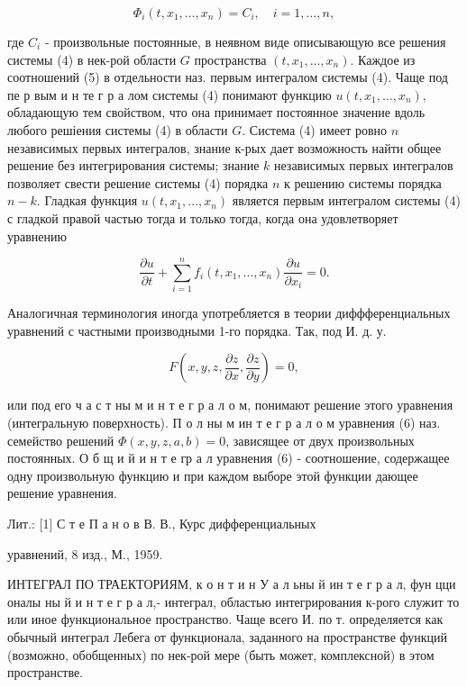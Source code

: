 \documentclass[10pt]{article}
\begin{document}
\[

\Phi_{i}\left(t, x_{1}, \ldots, x_{n}\right)=C_{i}, \quad i=1, \ldots, n,

\]



где $C_{i}$ - произвольные постоянные, в неявном виде описывающую все решения системы (4) в нек-рой области $G$ пространства $\left(t, x_{1}, \ldots, x_{n}\right)$. Каждое из соотношений (5) в отдельности наз. первым интегралом системы (4). Чаще под пе р вым и н те г р а лом системы (4) понимают функцию $u\left(t, x_{1}, \ldots, x_{n}\right)$, обладающую тем свойством, что она принимает постоянное значение вдоль любого решіения системы (4) в области $G$. Система (4) имеет ровно $n$ независимых первых интегралов, знание к-рых дает возможность найти общее решение без интегрирования системы; знание $k$ независимых первых интегралов позволяет свести решение системы (4) порядка $n$ к решению системы порядка $n-k$. Гладкая функция $u\left(t, x_{1}, \ldots, x_{n}\right)$ является первым интегралом системы (4) с гладкой правой частью тогда и только тогда, когда она удовлетворяет уравнению



\[

\frac{\partial u}{\partial t}+\sum_{i=1}^{n} f_{i}\left(t, x_{1}, \ldots, x_{n}\right) \frac{\partial u}{\partial x_{i}}=0 .

\]



Аналогичная терминология иногда употребляется в теории диффференциальных уравнений с частными производными 1-го порядка. Так, под И. д. у.



\[

F\left(x, y, z, \frac{\partial z}{\partial x}, \frac{\partial z}{\partial y}\right)=0,

\]



или под его ч а с т ны м и н т е г р а л о м, понимают решение этого уравнения (интегральную поверхность). П о л ны м ин т е г р а л о м уравнения (6) наз. семейство решений $\Phi(x, y, z, a, b)=0$, зависящее от двух произвольных постоянных. О б щ и й и н т е гр а л уравнения (6) - соотношение, содержащее одну произвольную функцию и при каждом выборе этой функции дающее решение уравнения.



Лит.: [1] С т е П а н о в В. В., Курс дифференциальных

уравнений, 8 изд., М., 1959.



ИНТЕГРАЛ ПО ТРАЕКТОРИЯМ, к о н т и н У а л ьны й ин т е г р а л, фун цци оналы ны й и н т е г р а л,- интеграл, областью интегрирования к-рого служит то или иное функциональное пространство. Чаще всего И. по т. определяется как обычный интеграл Лебега от функционала, заданного на пространстве функций (возможно, обобщенных) по нек-рой мере (быть может, комплексной) в этом пространстве.
\end{document}
